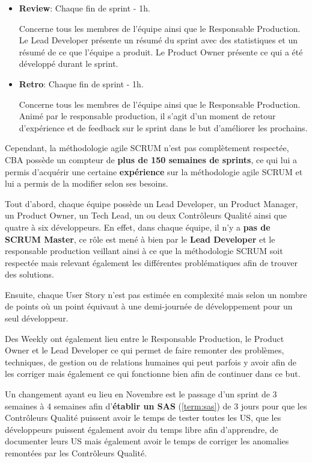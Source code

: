 \documentclass{article}
\begin{document}
\begin{itemize}
    \item \textbf{Review}: Chaque fin de sprint - 1h.

    Concerne tous les membres de l'équipe ainsi que le Responsable Production. \\
    Le Lead Developer présente un résumé du sprint avec des statistiques et un résumé de ce que l'équipe a produit.
    Le Product Owner présente ce qui a été développé durant le sprint.

    \item \textbf{Retro}: Chaque fin de sprint - 1h.

    Concerne tous les membres de l'équipe ainsi que le Responsable Production. \\
    Animé par le responsable production, il s'agit d'un moment de retour d'expérience et de feedback sur le sprint dans le but d'améliorer les prochains.
    
\end{itemize}

Cependant, la méthodologie agile SCRUM n'est pas complètement respectée, CBA possède un compteur de \textbf{plus de 150 semaines de sprints}, ce qui lui a permis d'acquérir une certaine \textbf{expérience} sur la méthodologie agile SCRUM et lui a permis de la modifier selon ses besoins.

Tout d'abord, chaque équipe possède un Lead Developer, un Product Manager, un Product Owner, un Tech Lead, un ou deux Contrôleurs Qualité ainsi que quatre à six développeurs. En effet, dans chaque équipe, il n'y a \textbf{pas de SCRUM Master}, ce rôle est mené à bien par le \textbf{Lead Developer} et le responsable production veillant ainsi à ce que la méthodologie SCRUM soit respectée mais relevant également les différentes problématiques afin de trouver des solutions.

Ensuite, chaque User Story n'est pas estimée en complexité mais selon un nombre de points où un point équivaut à une demi-journée de développement pour un seul développeur.

Des Weekly ont également lieu entre le Responsable Production, le Product Owner et le Lead Developer ce qui permet de faire remonter des problèmes, techniques, de gestion ou de relations humaines qui peut parfois y avoir afin de les corriger mais également ce qui fonctionne bien afin de continuer dans ce but.

Un changement ayant eu lieu en Novembre est le passage d'un sprint de 3 semaines à 4 semaines afin d'\textbf{établir un SAS} (\ref{term:sas}) de 3 jours pour que les Contrôleurs Qualité puissent avoir le temps de tester toutes les US, que les développeurs puissent également avoir du temps libre afin d'apprendre, de documenter leurs US mais également avoir le temps de corriger les anomalies remontées par les Contrôleurs Qualité.
\end{document}
